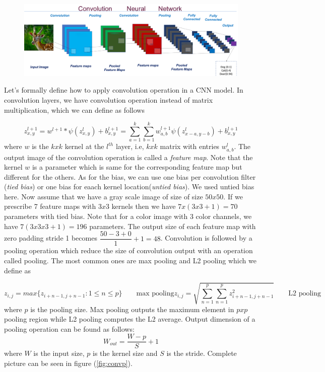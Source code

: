 \documentclass[12pt]{article}
\begin{document}
 \begin{figure}[H]
 \label{fig:cnn}
  \centering
  \includegraphics[width=1.1\textwidth]{CNN-2.png}
\end{figure}

Let's formally define how to apply convolution operation in a CNN model. In convolution layers, we have convolution operation instead of matrix multiplication, which we can define as follows

\begin{equation}
\label{eq:dcon}
z_{x,y}^{l+1} = w^{l+1}*\psi(z_{x,y}^{l}) + b_{x,y}^{l+1} = \sum\limits_{a=1}^{k} \sum\limits_{b=1}^{k} w_{a,b}^{l+1}\psi(z_{x-a,y-b}^{l})+b_{x,y}^{l+1}
\end{equation}
where $w$ is the $kxk$ kernel at the $l^{th}$ layer, i.e, $kxk$ matrix with entries $w_{a,b}^{l}$. The output image of the convolution operation is called a \textit{feature map}. Note that the kernel $w$ is a parameter which is same for the corresponding feature map but different for the others. As for the bias, we can use one bias per convolution filter (\textit{tied bias}) or one bias for eaach kernel location(\textit{untied bias}). We used untied bias here. Now assume that we have a gray scale image of size of size $50x50$. If we prescribe 7 feature maps with $3x3$ kernels then we have $ 7x(3x3 + 1) = 70 $ parameters with tied bias. Note that for a color image with 3 color channels, we have   $7(3x3x3+1) = 196 $ parameters. The output size of each feature map with zero padding stride 1 becomes $\dfrac{50-3+0}{1}+1 = 48 $. Convolution is followed by a pooling operation which reduce the size of convolution output with an operation called pooling. The most common ones are max pooling and L2 pooling which we define as 

\begin{subequations}
\begin{equation}
z_{i,j} = max\{z_{i+n-1,j+n-1} : 1\leq n \leq p \}  \quad\quad \text{max pooling}
\end{equation} 

\begin{equation}
z_{i,j} = \sqrt{\sum\limits_{n=1}^{p} \sum\limits_{n=1}^{p} z_{i+n-1,j+n-1}^{2}} \quad\quad \text{L2 pooling}
\end{equation}
\end{subequations}
where $p$ is the pooling size. Max pooling outputs  the maximum element in $pxp$ pooling region while L2 pooling computes the L2 average. Output dimension of a pooling operation can be found as follows:
$$
W_{out} = \dfrac{W-p}{S}+1
$$
where $W$ is the input size, $p$ is the kernel size and $S$ is the stride.
Complete picture can be seen in figure (\ref{fig:convp}).
\end{document}

